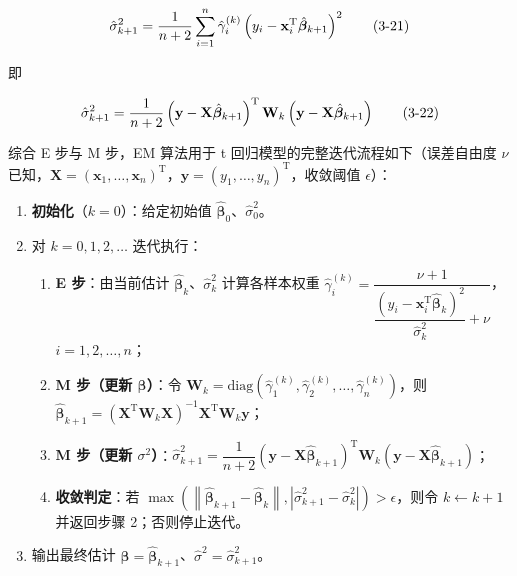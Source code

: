 \documentclass[12pt,a4paper]{ctexart}
\makeatletter
\numberwithin{figure}{section}
\numberwithin{table}{section}
\let\ltx@orig@tag\tag
\renewcommand{\tag}[1]{\refstepcounter{equation}\ltx@orig@tag{#1}}%
\makeatother
\begin{document}
\begin{equation}
\hat{\sigma}_{k+1}^2 = \frac{1}{n+2}\sum_{i=1}^{n} \hat{\gamma}_i^{(k)}\left(y_i - \mathbf{x}_i^{\mathrm{T}} \hat{\boldsymbol{\beta}}_{k+1}\right)^2 \tag{3-21}
\end{equation}

即

\begin{equation}
\hat{\sigma}_{k+1}^2 = \frac{1}{n+2}\left(\mathbf{y} - \mathbf{X}\hat{\boldsymbol{\beta}}_{k+1}\right)^{\mathrm{T}} \mathbf{W}_k \left(\mathbf{y} - \mathbf{X}\hat{\boldsymbol{\beta}}_{k+1}\right) \tag{3-22}
\end{equation}

综合 E 步与 M 步，EM 算法用于 t 回归模型的完整迭代流程如下（误差自由度 $\nu$ 已知，$\mathbf{X}=(\mathbf{x}_1,\ldots,\mathbf{x}_n)^{\mathrm{T}}$，$\mathbf{y}=(y_1,\ldots,y_n)^{\mathrm{T}}$，收敛阈值 $\epsilon$）：

\begin{enumerate}
  \item \textbf{初始化}（$k=0$）：给定初始值 $\hat{\boldsymbol{\beta}}_{0}$、$\hat{\sigma}_{0}^{2}$。
  \item 对 $k=0,1,2,\ldots$ 迭代执行：
\begin{enumerate}
    \item \textbf{E 步}：由当前估计 $\hat{\boldsymbol{\beta}}_{k}$、$\hat{\sigma}_{k}^{2}$ 计算各样本权重 $\hat{\gamma}_{i}^{(k)}=\dfrac{\nu+1}{\dfrac{\left(y_{i}-\mathbf{x}_{i}^{\mathrm{T}}\hat{\boldsymbol{\beta}}_{k}\right)^{2}}{\hat{\sigma}_{k}^{2}}+\nu}$，$i=1,2,\ldots,n$；
    \item \textbf{M 步（更新 $\boldsymbol{\beta}$）}：令 $\mathbf{W}_{k}=\mathrm{diag}\left(\hat{\gamma}_{1}^{(k)},\hat{\gamma}_{2}^{(k)},\ldots,\hat{\gamma}_{n}^{(k)}\right)$，则 $\hat{\boldsymbol{\beta}}_{k+1}=\left(\mathbf{X}^{\mathrm{T}}\mathbf{W}_{k}\mathbf{X}\right)^{-1}\mathbf{X}^{\mathrm{T}}\mathbf{W}_{k}\mathbf{y}$；
    \item \textbf{M 步（更新 $\sigma^{2}$）}：$\hat{\sigma}_{k+1}^{2}=\dfrac{1}{n+2}\left(\mathbf{y}-\mathbf{X}\hat{\boldsymbol{\beta}}_{k+1}\right)^{\mathrm{T}}\mathbf{W}_{k}\left(\mathbf{y}-\mathbf{X}\hat{\boldsymbol{\beta}}_{k+1}\right)$；
    \item \textbf{收敛判定}：若 $\max\left(\left\|\hat{\boldsymbol{\beta}}_{k+1}-\hat{\boldsymbol{\beta}}_{k}\right\|,\left|\hat{\sigma}_{k+1}^{2}-\hat{\sigma}_{k}^{2}\right|\right)>\epsilon$，则令 $k\leftarrow k+1$ 并返回步骤 2；否则停止迭代。
\end{enumerate}
  \item 输出最终估计 $\hat{\boldsymbol{\beta}}=\hat{\boldsymbol{\beta}}_{k+1}$、$\hat{\sigma}^{2}=\hat{\sigma}_{k+1}^{2}$。
\end{enumerate}
\end{document}
